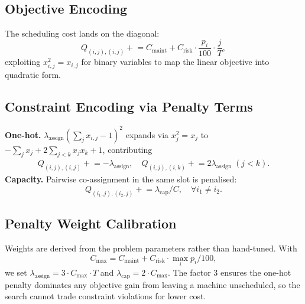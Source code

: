 \subsection{Objective Encoding}
The scheduling cost lands on the diagonal:
\begin{equation}
Q_{(i,j),(i,j)} \mathrel{+}=
C_{\text{maint}} + C_{\text{risk}} \cdot \frac{p_i}{100} \cdot \frac{j}{T},
\end{equation}
exploiting $x_{i,j}^2 = x_{i,j}$ for binary variables to map the linear objective into quadratic form.

\subsection{Constraint Encoding via Penalty Terms}
\textbf{One-hot.} $\lambda_{\text{assign}} (\sum_j x_{i,j} - 1)^2$ expands via $x_j^2 = x_j$ to $-\sum_j x_j + 2\sum_{j<k} x_j x_k + 1$, contributing
\begin{align}
Q_{(i,j),(i,j)} \mathrel{+}= -\lambda_{\text{assign}}, \quad
Q_{(i,j),(i,k)} \mathrel{+}= 2\lambda_{\text{assign}}\;(j<k).
\end{align}
\textbf{Capacity.} Pairwise co-assignment in the same slot is penalised:
\begin{equation}
Q_{(i_1,j),(i_2,j)} \mathrel{+}= \lambda_{\text{cap}} / C, \quad \forall i_1 \neq i_2.
\end{equation}

\subsection{Penalty Weight Calibration}
Weights are derived from the problem parameters rather than hand-tuned. With
\begin{equation}
C_{\max} = C_{\text{maint}} + C_{\text{risk}} \cdot \max_i p_i / 100,
\end{equation}
we set $\lambda_{\text{assign}} = 3 \cdot C_{\max} \cdot T$ and $\lambda_{\text{cap}} = 2 \cdot C_{\max}$. The factor 3 ensures the one-hot penalty dominates any objective gain from leaving a machine unscheduled, so the search cannot trade constraint violations for lower cost.

